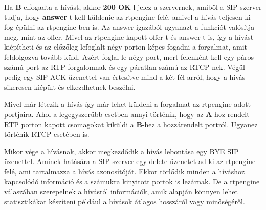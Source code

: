 Ha \textbf{B} elfogadta a hívást, akkor \textbf{200 OK}-l jelez a szervernek, amiből a
SIP szerver tudja, hogy \textbf{answer}-t kell küldenie az rtpengine felé, amivel a hívás teljesen
ki fog épülni az rtpengine-ben is. Az answer igazából ugyanazt a funkciót valósítja meg,
mint az offer. Mivel az rtpengine kapott offer-t és answer-t is, így a hívást kiépítheti
és az előzőleg lefoglalt négy porton képes fogadni a forgalmat, amit feldolgozva 
tovább küld. Azért foglal le négy port, mert felenként kell egy páros számú port az 
RTP forgalomnak és egy páratlan számú az RTCP-nek. Végül pedig egy SIP ACK üzenettel van
értesítve mind a két fél arról, hogy a hívás sikeresen kiépült és elkezdhetnek 
beszélni. 

Mivel már létezik a hívás így már lehet küldeni a forgalmat az rtpengine adott 
portjaira. Ahol a legegyszerűbb esetben annyi történik, hogy az \textbf{A}-hoz rendelt
RTP porton kapott csomagokat kiküldi a \textbf{B}-hez a hozzárendelt portról. Ugyanez
történik RTCP esetében is. 

Mikor vége a hívásnak, akkor megkezdődik a hívás lebontása egy BYE SIP üzenettel. Aminek
hatására a SIP szerver egy delete üzenetet ad ki az rtpengine felé, ami tartalmazza a hívás
azonosítóját. Ekkor törlődik minden a híváshoz kapcsolódó információ és a számukra kinyitott
portok is lezárnak. De a rtpengine válaszában szerepelnek a hívásról információk, amik alapján
könnyen lehet statisztikákat készíteni például a hívások átlagos hosszáról vagy minőségéről.